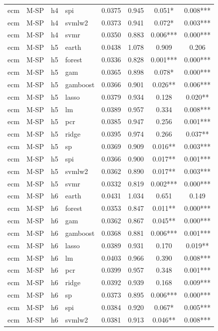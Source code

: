 \begin{ThreePartTable}
\begin{longtable}[t]{llclcccc}
ecm & M-SP & h4 & spi & 0.0375 & 0.945 & 0.051* & 0.008***\\
ecm & M-SP & h4 & svmlw2 & 0.0373 & 0.941 & 0.072* & 0.003***\\
ecm & M-SP & h4 & svmr & 0.0350 & 0.883 & 0.006*** & 0.000***\\
\addlinespace
ecm & M-SP & h5 & earth & 0.0438 & 1.078 & 0.909 & 0.206\\
ecm & M-SP & h5 & forest & 0.0336 & 0.828 & 0.001*** & 0.000***\\
ecm & M-SP & h5 & gam & 0.0365 & 0.898 & 0.078* & 0.000***\\
ecm & M-SP & h5 & gamboost & 0.0366 & 0.901 & 0.026** & 0.006***\\
ecm & M-SP & h5 & lasso & 0.0379 & 0.934 & 0.128 & 0.020**\\
ecm & M-SP & h5 & lm & 0.0389 & 0.957 & 0.334 & 0.008***\\
ecm & M-SP & h5 & pcr & 0.0385 & 0.947 & 0.256 & 0.001***\\
ecm & M-SP & h5 & ridge & 0.0395 & 0.974 & 0.266 & 0.037**\\
ecm & M-SP & h5 & sp & 0.0369 & 0.909 & 0.016** & 0.003***\\
ecm & M-SP & h5 & spi & 0.0366 & 0.900 & 0.017** & 0.001***\\
ecm & M-SP & h5 & svmlw2 & 0.0362 & 0.890 & 0.017** & 0.003***\\
ecm & M-SP & h5 & svmr & 0.0332 & 0.819 & 0.002*** & 0.000***\\
\addlinespace
ecm & M-SP & h6 & earth & 0.0431 & 1.034 & 0.651 & 0.149\\
ecm & M-SP & h6 & forest & 0.0353 & 0.847 & 0.011** & 0.000***\\
ecm & M-SP & h6 & gam & 0.0362 & 0.867 & 0.045** & 0.000***\\
ecm & M-SP & h6 & gamboost & 0.0368 & 0.881 & 0.006*** & 0.001***\\
ecm & M-SP & h6 & lasso & 0.0389 & 0.931 & 0.170 & 0.019**\\
ecm & M-SP & h6 & lm & 0.0403 & 0.966 & 0.390 & 0.008***\\
ecm & M-SP & h6 & pcr & 0.0399 & 0.957 & 0.348 & 0.001***\\
ecm & M-SP & h6 & ridge & 0.0392 & 0.939 & 0.168 & 0.009***\\
ecm & M-SP & h6 & sp & 0.0373 & 0.895 & 0.006*** & 0.000***\\
ecm & M-SP & h6 & spi & 0.0384 & 0.920 & 0.067* & 0.005***\\
ecm & M-SP & h6 & svmlw2 & 0.0381 & 0.913 & 0.046** & 0.008***\\

\end{longtable}
\end{ThreePartTable}

